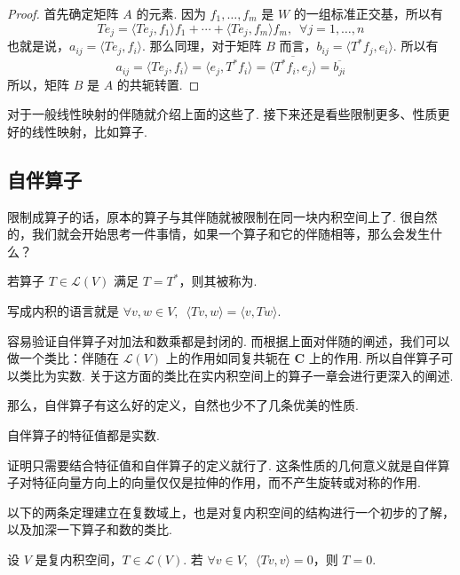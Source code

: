\begin{proof}
    首先确定矩阵 $ A $ 的元素. 因为 $ f_1, \ldots , f_m $ 是 $ W $ 的一组标准正交基，所以有
    \[ Te_j = \langle Te_j, f_1 \rangle f_1 + \cdots + \langle Te_j, f_m \rangle f_m,\enspace \forall j = 1, \ldots , n \]
    也就是说，$ a_{ij} = \langle Te_j, f_i \rangle $. 那么同理，对于矩阵 $ B $ 而言，$ b_{ij} = \langle T^*f_j, e_i \rangle $. 所以有
    \[ a_{ij} = \langle Te_j, f_i \rangle = \langle e_j, T^*f_i \rangle = \overline{\langle T^*f_i, e_j \rangle} = \overline{b_{ji}} \]
    所以，矩阵 $ B $ 是 $ A $ 的共轭转置.
\end{proof}

对于一般线性映射的伴随就介绍上面的这些了. 接下来还是看些限制更多、性质更好的线性映射，比如算子.

\subsection{自伴算子}

限制成算子的话，原本的算子与其伴随就被限制在同一块内积空间上了. 很自然的，我们就会开始思考一件事情，如果一个算子和它的伴随相等，那么会发生什么？

\begin{definition}[自伴算子] 
    若算子 $ T \in \mathcal{L}(V) $ 满足 $ T = T^* $，则其被称为.
\end{definition}

写成内积的语言就是 $ \forall v, w \in V,\enspace \langle Tv, w \rangle = \langle v, Tw \rangle $.

容易验证自伴算子对加法和数乘都是封闭的. 而根据上面对伴随的阐述，我们可以做一个类比：伴随在 $ \mathcal{L}(V) $ 上的作用如同复共轭在 $ \mathbf{C} $ 上的作用. 所以自伴算子可以类比为实数. 关于这方面的类比在实内积空间上的算子一章会进行更深入的阐述.

那么，自伴算子有这么好的定义，自然也少不了几条优美的性质.

\begin{theorem}
    自伴算子的特征值都是实数.
\end{theorem}

证明只需要结合特征值和自伴算子的定义就行了. 这条性质的几何意义就是自伴算子对特征向量方向上的向量仅仅是拉伸的作用，而不产生旋转或对称的作用.

以下的两条定理建立在复数域上，也是对复内积空间的结构进行一个初步的了解，以及加深一下算子和数的类比.

\begin{theorem} \label{thm:24:复内积空间}
    设 $ V $ 是复内积空间，$ T \in \mathcal{L}(V) $. 若 $ \forall v \in V,\enspace \langle Tv, v \rangle = 0 $，则 $ T = 0 $.
\end{theorem}

